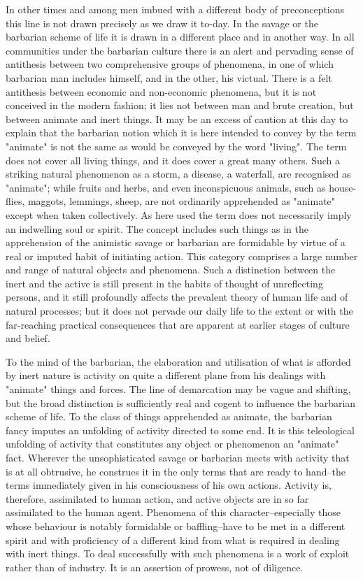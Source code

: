 \documentclass[12pt]{report}
\begin{document}
In other times and among men imbued with a different body of
preconceptions this line is not drawn precisely as we draw it to-day.
In the savage or the barbarian scheme of life it is drawn in a different
place and in another way. In all communities under the barbarian
culture there is an alert and pervading sense of antithesis between
two comprehensive groups of phenomena, in one of which barbarian
man includes himself, and in the other, his victual. There is a felt
antithesis between economic and non-economic phenomena, but it is not
conceived in the modern fashion; it lies not between man and brute
creation, but between animate and inert things.
\clearpage
It may be an excess of caution at this day to explain that the barbarian
notion which it is here intended to convey by the term "animate" is not
the same as would be conveyed by the word "living". The term does not
cover all living things, and it does cover a great many others. Such
a striking natural phenomenon as a storm, a disease, a waterfall, are
recognised as "animate"; while fruits and herbs, and even inconspicuous
animals, such as house-flies, maggots, lemmings, sheep, are not
ordinarily apprehended as "animate" except when taken collectively.
As here used the term does not necessarily imply an indwelling soul or
spirit. The concept includes such things as in the apprehension of the
animistic savage or barbarian are formidable by virtue of a real or
imputed habit of initiating action. This category comprises a large
number and range of natural objects and phenomena. Such a distinction
between the inert and the active is still present in the habits of
thought of unreflecting persons, and it still profoundly affects the
prevalent theory of human life and of natural processes; but it does not
pervade our daily life to the extent or with the far-reaching practical
consequences that are apparent at earlier stages of culture and belief.

To the mind of the barbarian, the elaboration and utilisation of what is
afforded by inert nature is activity on quite a different plane from his
dealings with "animate" things and forces. The line of demarcation may
be vague and shifting, but the broad distinction is sufficiently real
and cogent to influence the barbarian scheme of life. To the class of
things apprehended as animate, the barbarian fancy imputes an unfolding
of activity directed to some end. It is this teleological unfolding of
activity that constitutes any object or phenomenon an "animate" fact.
Wherever the unsophisticated savage or barbarian meets with activity
that is at all obtrusive, he construes it in the only terms that are
ready to hand--the terms immediately given in his consciousness of his
own actions. Activity is, therefore, assimilated to human action, and
active objects are in so far assimilated to the human agent. Phenomena
of this character--especially those whose behaviour is notably
formidable or baffling--have to be met in a different spirit and with
proficiency of a different kind from what is required in dealing with
inert things. To deal successfully with such phenomena is a work of
exploit rather than of industry. It is an assertion of prowess, not of
diligence.
\end{document}
